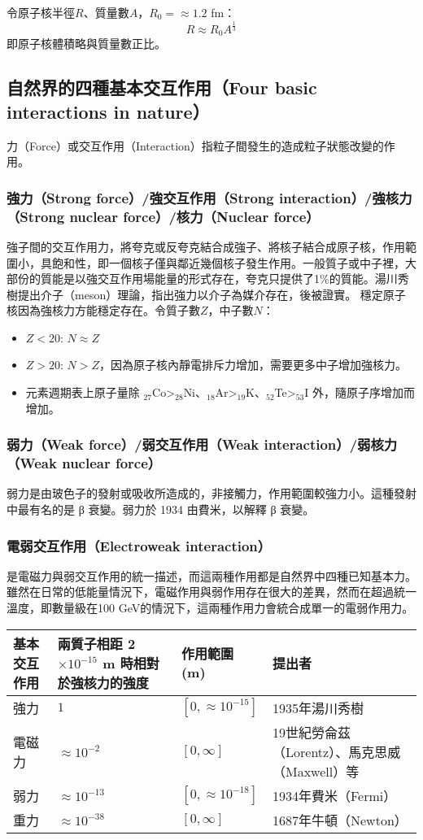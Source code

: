 \documentclass[a4paper,12pt]{article}
\begin{document}
令原子核半徑$R$、質量數$A$，$R_0=
\approx 1.2$ fm：
\[R\approx R_0A^{\frac{1}{3}}\]
即原子核體積略與質量數正比。


\subsection{自然界的四種基本交互作用（Four basic interactions in nature）}
力（Force）或交互作用（Interaction）指粒子間發生的造成粒子狀態改變的作用。
\subsubsection{強力（Strong force）/強交互作用（Strong interaction）/強核力（Strong nuclear force）/核力（Nuclear force）}
強子間的交互作用力，將夸克或反夸克結合成強子、將核子結合成原子核，作用範圍小，具飽和性，即一個核子僅與鄰近幾個核子發生作用。一般質子或中子裡，大部份的質能是以強交互作用場能量的形式存在，夸克只提供了1\%的質能。湯川秀樹提出介子（meson）理論，指出強力以介子為媒介存在，後被證實。
\bctf{}\efct
穩定原子核因為強核力方能穩定存在。令質子數$Z$，中子數$N$：
\begin{itemize}
\item $Z<20$: $N\approx Z$
\item $Z>20$: $N>Z$，因為原子核內靜電排斥力增加，需要更多中子增加強核力。
\item 元素週期表上原子量除 $_{27}$Co>$_{28}$Ni、$_{18}$Ar>$_{19}$K、$_{52}$Te>$_{53}$I 外，隨原子序增加而增加。
\end{itemize}
\subsubsection{弱力（Weak force）/弱交互作用（Weak interaction）/弱核力（Weak nuclear force）}
弱力是由玻色子的發射或吸收所造成的，非接觸力，作用範圍較強力小。這種發射中最有名的是  β  衰變。弱力於 1934 由費米，以解釋 β 衰變。
\subsubsection{電弱交互作用（Electroweak interaction）}
是電磁力與弱交互作用的統一描述，而這兩種作用都是自然界中四種已知基本力。雖然在日常的低能量情況下，電磁作用與弱作用存在很大的差異，然而在超過統一溫度，即數量級在100 GeV的情況下，這兩種作用力會統合成單一的電弱作用力。
\begin{longtable}[c]{|p{}|p{}|p{}|p{}|}
\hline
基本交互作用 & 兩質子相距 2$\times 10^{-15}$ m 時相對於強核力的強度 & 作用範圍 (m) & 提出者\\\hline
強力 & $1$ & $[0, \approx 10^{-15}]$ & 1935年湯川秀樹\\\hline
電磁力 & $\approx 10^{-2}$ & $[0, \infty]$ & 19世紀勞侖茲（Lorentz）、馬克思威（Maxwell）等\\\hline
弱力 & $\approx 10^{-13}$ & $[0, \approx 10^{-18}]$ & 1934年費米（Fermi）\\\hline
重力 & $\approx 10^{-38}$ & $[0, \infty]$ & 1687年牛頓（Newton）\\\hline
\end{longtable}\FB
 
\end{document}
